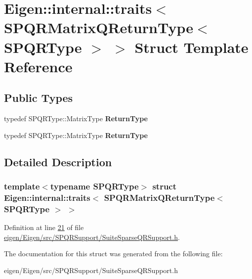 \hypertarget{struct_eigen_1_1internal_1_1traits_3_01_s_p_q_r_matrix_q_return_type_3_01_s_p_q_r_type_01_4_01_4}{}\section{Eigen\+:\+:internal\+:\+:traits$<$ S\+P\+Q\+R\+Matrix\+Q\+Return\+Type$<$ S\+P\+Q\+R\+Type $>$ $>$ Struct Template Reference}
\label{struct_eigen_1_1internal_1_1traits_3_01_s_p_q_r_matrix_q_return_type_3_01_s_p_q_r_type_01_4_01_4}
\subsection*{Public Types}
\begin{DoxyCompactItemize}
\item 
\mbox{\label{struct_eigen_1_1internal_1_1traits_3_01_s_p_q_r_matrix_q_return_type_3_01_s_p_q_r_type_01_4_01_4_a7e131606cb1aaabe1ffa494e9ca2fa91}} 
typedef S\+P\+Q\+R\+Type\+::\+Matrix\+Type {\bfseries Return\+Type}
\item 
\mbox{\label{struct_eigen_1_1internal_1_1traits_3_01_s_p_q_r_matrix_q_return_type_3_01_s_p_q_r_type_01_4_01_4_a7e131606cb1aaabe1ffa494e9ca2fa91}} 
typedef S\+P\+Q\+R\+Type\+::\+Matrix\+Type {\bfseries Return\+Type}
\end{DoxyCompactItemize}


\subsection{Detailed Description}
\subsubsection*{template$<$typename S\+P\+Q\+R\+Type$>$\newline
struct Eigen\+::internal\+::traits$<$ S\+P\+Q\+R\+Matrix\+Q\+Return\+Type$<$ S\+P\+Q\+R\+Type $>$ $>$}



Definition at line \hyperlink{eigen_2_eigen_2src_2_s_p_q_r_support_2_suite_sparse_q_r_support_8h_source_l00021}{21} of file \hyperlink{eigen_2_eigen_2src_2_s_p_q_r_support_2_suite_sparse_q_r_support_8h_source}{eigen/\+Eigen/src/\+S\+P\+Q\+R\+Support/\+Suite\+Sparse\+Q\+R\+Support.\+h}.



The documentation for this struct was generated from the following file\+:\begin{DoxyCompactItemize}
\item 
eigen/\+Eigen/src/\+S\+P\+Q\+R\+Support/\+Suite\+Sparse\+Q\+R\+Support.\+h\end{DoxyCompactItemize}
